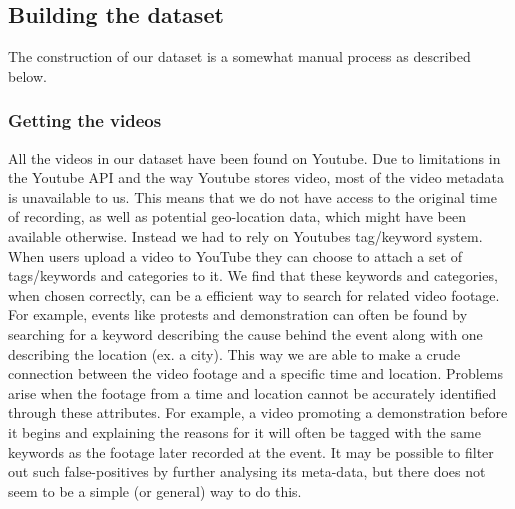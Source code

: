 \subsection{Building the dataset}
%
The construction of our dataset is a somewhat manual process as described below. %
%
\subsubsection{Getting the videos}
%
All the videos in our dataset have been found on Youtube. Due to limitations in the Youtube API and the way Youtube stores video, most of the video metadata is unavailable to us. This means that we do not have access to the original time of recording, as well as potential geo-location data, which might have been available otherwise. Instead we had to rely on Youtubes tag/keyword system. When users upload a video to YouTube they can choose to attach a set of tags/keywords and categories to it. We find that these keywords and categories, when chosen correctly, can be a efficient way to search for related video footage. For example, events like protests and demonstration can often be found by searching for a keyword describing the cause behind the event along with one describing the location (ex. a city). This way we are able to make a crude connection between the video footage and a specific time and location. Problems arise when the footage from a time and location cannot be accurately identified through these attributes. For example, a video promoting a demonstration before it begins and explaining the reasons for it will often be tagged with the same keywords as the footage later recorded at the event. It may be possible to filter out such false-positives by further analysing its meta-data, but there does not seem to be a simple (or general) way to do this.\\\\
%
%
